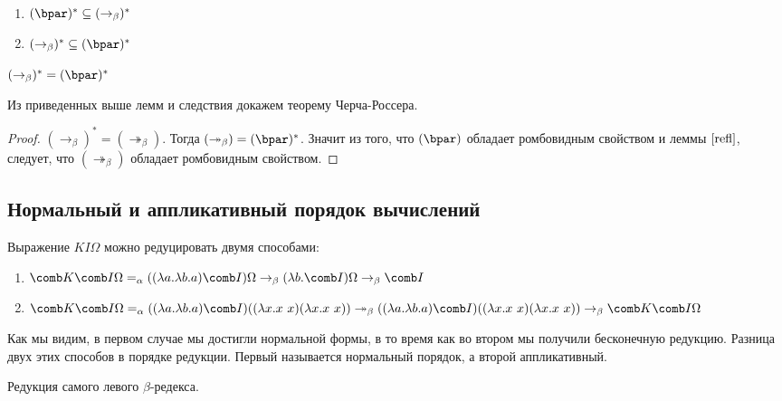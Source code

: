 \begin{lemma}
	\
	\begin{enumerate}
		\item $(\bpar )^{*} \subseteq (\to_{\beta})^{*}$
		\item $(\to_{\beta})^{*} \subseteq (\bpar )^{*}$
	\end{enumerate}
\end{lemma}

\begin{cons}
	$(\to_{\beta})^{*}=(\bpar )^{*}$
\end{cons}

Из приведенных выше лемм и следствия докажем теорему Черча-Россера.

\begin{proof}
	$(\to_{\beta})^{*} = (\twoheadrightarrow_{\beta})$. Тогда $(\twoheadrightarrow_{\beta})=(\bpar )^{*}$. Значит из того, что $(\bpar )$ обладает ромбовидным свойством и леммы $\ref{refl}$, следует, что $(\twoheadrightarrow_{\beta})$ обладает ромбовидным свойством.
\end{proof}

\subsection{Нормальный и аппликативный порядок вычислений}

\begin{example}
	Выражение $KI\Omega$ можно редуцировать двумя способами:
	\begin{enumerate}
		\item $\comb K \comb I \Omega =_{\alpha} ((\lambda{}a.\lambda{}b.a) \comb I) \Omega \to_{\beta} (\lambda{}b.\comb I)\Omega  \to_{\beta} \comb I$
		\item  $\comb K \comb I \Omega =_{\alpha} ((\lambda{}a.\lambda{}b.a) \comb I)((\lambda{}x.x \ x) (\lambda{}x.x \ x)) \twoheadrightarrow_{\beta} ((\lambda{}a.\lambda{}b.a) \comb I)((\lambda{}x.x \ x) (\lambda{}x.x \ x)) \to_{\beta} \comb K \comb I \Omega $
	\end{enumerate}
	
\end{example}

Как мы видим, в первом случае мы достигли нормальной формы, в то время как во втором мы получили бесконечную редукцию. Разница двух этих способов в порядке редукции. Первый называется нормальный порядок, а второй аппликативный. 

\begin{definition}
	Редукция самого левого $\beta$-редекса.
\end{definition}

